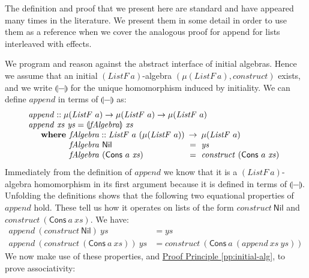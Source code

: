 \documentclass{jfp1}
\newcommand{\fold}[1]{\llparenthesis #1 \rrparenthesis}
\newcommand{\proofprinref}[1]{\hyperref[#1]{Proof Principle \ref*{#1}}}
\newcommand{\kw}[1]{\textbf{#1}}
\begin{document}
The definition and proof that we present here are standard and have
appeared many times in the literature. We present them in some detail
in order to use them as a reference when we cover the analogous proof
for append for lists interleaved with effects.

We program and reason against the abstract interface of initial
algebras. Hence we assume that an initial $(\mathit{ListF}~a)$-algebra
$(\mu(\mathit{ListF}~a), \mathit{construct})$ exists, and we write
$\fold{-}$ for the unique homomorphism induced by initiality. We can
define $\mathit{append}$ in terms of $\fold{-}$ as:
\begin{displaymath}
  \begin{array}{l}
    \mathit{append} :: \mu(\mathit{ListF}~a) \to \mu(\mathit{ListF}~a) \to \mu(\mathit{ListF}~a) \\
    \mathit{append}~\mathit{xs}~\mathit{ys} = \fold{\mathit{fAlgebra}}~\mathit{xs} \\
    \quad\begin{array}{r@{\hspace{0.4em}}l@{\hspace{0.5em}}c@{\hspace{0.5em}}l}
      \kw{where} & \mathit{fAlgebra} :: \mathit{ListF}~a~(\mu(\mathit{ListF}~a)) &\to& \mu(\mathit{ListF}~a) \\
      & \mathit{fAlgebra}~\mathsf{Nil} &=& \mathit{ys} \\
      & \mathit{fAlgebra}~(\mathsf{Cons}~a~\mathit{xs}) &=& \mathit{construct}~(\mathsf{Cons}~a~\mathit{xs})
    \end{array}
  \end{array}
\end{displaymath}
Immediately from the definition of $\mathit{append}$ we know that it
is a $(\mathit{ListF}~a)$-algebra homomorphism in its first argument
because it is defined in terms of $\fold{-}$. Unfolding the
definitions shows that the following two equational properties of
$\mathit{append}$ hold. These tell us how it operates on lists of the
form $\mathit{construct}~\mathsf{Nil}$ and
$\mathit{construct}~(\mathsf{Cons}~a~\mathit{xs})$. We have:
\begin{align}
  \label{eq:append-nil}
  \mathit{append}~(\mathit{construct}~\mathsf{Nil})~\mathit{ys} & = \mathit{ys} \\
  \label{eq:append-cons}
  \mathit{append}~(\mathit{construct}~(\mathsf{Cons}~a~\mathit{xs}))~\mathit{ys} & = \mathit{construct}~(\mathsf{Cons}~a~(\mathit{append}~\mathit{xs}~\mathit{ys}))
\end{align}
We now make use of these properties, and
\proofprinref{pp:initial-alg}, to prove associativity:
\end{document}
